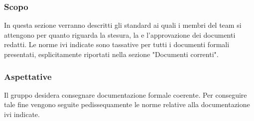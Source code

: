 \subsubsection{Scopo}
In questa sezione verranno descritti gli standard ai quali i membri del team si attengono per quanto riguarda la stesura, la  e l'approvazione dei documenti redatti. Le norme ivi indicate sono tassative per tutti i documenti formali presentati, esplicitamente riportati nella sezione "Documenti correnti".


\subsubsection{Aspettative}
Il gruppo desidera consegnare documentazione formale coerente. Per conseguire tale fine vengono seguite pedissequamente le norme relative alla documentazione ivi indicate. 

